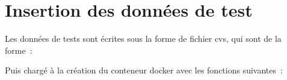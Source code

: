 \section{Insertion des données de test}
Les données de tests sont écrites sous la forme de fichier cvs, qui sont de la forme~:



Puis chargé à la création du conteneur docker avec les fonctions suivantes~:


